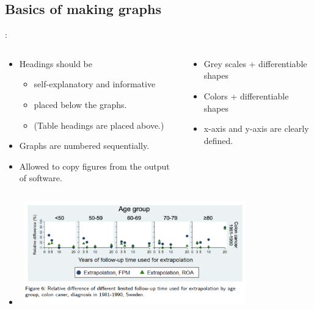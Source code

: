 \subsection{Basics of making graphs}
\begin{frame}{\secname: \subsecname}
\begin{columns}[t]
\begin{column}{0.6\textwidth}	
	
\begin{itemize}
\item<1|handout:1-> Headings should be 
	\begin{itemize}
	\item self-explanatory and informative
	\item placed below the graphs.
	\item (Table headings  are placed above.)
	\end{itemize}
\item<2|handout:2-> Graphs are numbered sequentially.
\item <3|handout:3-> Allowed to copy figures from the output of software.
	\end{itemize}
	
\end{column}

\begin{column}{0.4\textwidth}	
\begin{itemize}

\item <4|handout:4-> Grey scales + differentiable shapes
\item <4|handout:4-> Colors + differentiable shapes
\item <5|handout:5-> x-axis and y-axis are clearly defined. 
\end{itemize}
\end{column}
\end{columns}

\begin{itemize}
\item[]<6|handout:6>	
\begin{center}
\includegraphics[width=10cm, height=4.5cm]{images/myexample}
\end{center}
\end{itemize}
\end{frame}
